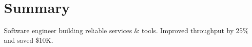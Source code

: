 \section{Summary}
\begin{cvparagraph}
  Software engineer building reliable services \& tools.
  Improved throughput by 25\% and saved \$10K.
\end{cvparagraph}
